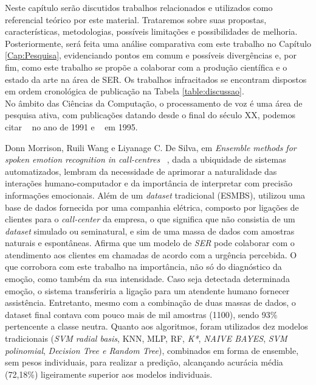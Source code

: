 
Neste capítulo serão discutidos trabalhos relacionados e utilizados como referencial teórico por este material. Trataremos sobre suas propostas, características, metodologias, possíveis limitações e possibilidades de melhoria. Posteriormente, será feita uma análise comparativa com este trabalho no Capítulo \ref{Cap:Pesquisa}, evidenciando pontos em comum e possíveis divergências e, por fim, como este trabalho se propõe a colaborar com a produção científica e o estado da arte na área de \acrshort{SER}. Os trabalhos infracitados se encontram dispostos em ordem cronológica de publicação na Tabela \ref{table:discussao}.\\


No âmbito das Ciências da Computação, o processamento de voz é uma área de pesquisa ativa, com publicações datando desde o final do século XX, podemos citar ~\cite{12.27} no ano de 1991 e ~\cite{12.28} em 1995.


Donn Morrison, Ruili Wang e Liyanage C. De Silva, em \textit{Ensemble methods for spoken emotion recognition in call-centres} ~\cite{32.32}, dada a ubiquidade de sistemas automatizados, lembram da necessidade de aprimorar a naturalidade das interações humano-computador e da importância de interpretar com precisão informações emocionais. Além de um \textit{dataset} tradicional (ESMBS), utilizou uma base de dados fornecida por uma companhia elétrica, composto por ligações de clientes para o \textit{call-center} da empresa, o que significa que não consistia de um \textit{dataset} simulado ou seminatural, e sim de uma massa de dados com amostras naturais e espontâneas. Afirma que um modelo de \textit{SER} pode colaborar com o atendimento aos clientes em chamadas de acordo com a urgência percebida. O que corrobora com este trabalho na importância, não só do diagnóstico da emoção, como também da sua intensidade. Caso seja detectada determinada emoção, o sistema transferiria a ligação para um atendente humano fornecer assistência. Entretanto, mesmo com a combinação de duas massas de dados, o dataset final contava com pouco mais de mil amostras (1100), sendo 93\% pertencente a classe neutra. Quanto aos algoritmos, foram utilizados dez modelos tradicionais (\textit{SVM radial basis}, \acrshort{KNN}, \acrshort{MLP}, \acrshort{RF}, \textit{K*}, \textit{NAIVE BAYES}, \textit{SVM polinomial}, \textit{Decision Tree e Random Tree}), combinados em forma de ensemble, sem pesos individuais, para realizar a predição, alcançando acurácia média (72,18\%) ligeiramente superior aos modelos individuais.


